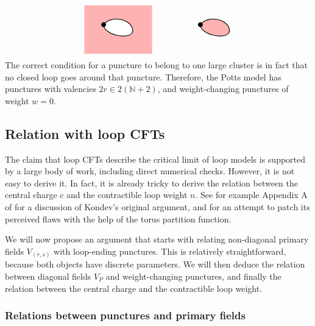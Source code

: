\documentclass[12pt, a4paper]{article}
\theoremstyle{break}
\begin{document}
\begin{align}
 \begin{tikzpicture}[baseline=(current  bounding  box.center), scale = .4]
  \fill[red!30] (-2, -3) rectangle (5, 2);
  \filldraw[thick, fill = white] (0, 0) to [out = -90, in = -80] (3, -.5) to [out = 100, in = 55] (0, 0);
   \draw (0, 0) node[fill, circle, minimum size = 2mm, inner sep = 0]{};
   \filldraw[thick, fill = red!30] (10, 0) to [out = -90, in = -80] (13, -.5) to [out = 100, in = 55] (10, 0);
   \draw (10, 0) node[fill, circle, minimum size = 2mm, inner sep = 0]{};
 \end{tikzpicture}
\end{align}
The correct condition for a puncture to belong to one large cluster is in fact that no closed loop goes around that puncture. 
Therefore, the Potts model has punctures with valencies $2r\in 2(\mathbb{N}+2)$, and weight-changing punctures of weight $w=0$.


\subsection{Relation with loop CFTs}

The claim that loop CFTs describe the critical limit of loop models is supported by a large body of work, including direct numerical checks. However, it is not easy to derive it. In fact, it is already tricky to derive the relation between the central charge $c$ and the contractible loop weight $n$. See for example Appendix A of \cite{grz18} for a discussion of Kondev's original argument, and for an attempt to patch its perceived flaws with the help of the torus partition function. 

We will now propose an argument that starts with relating non-diagonal primary fields $V_{(r,s)}$ with loop-ending punctures. This is relatively straightforward, because both objects have discrete parameters. We will then deduce the relation between diagonal fields $V_P$ and weight-changing punctures, and finally the relation between the central charge and the contractible loop weight. 

\subsubsection{Relations between punctures and primary fields}
\end{document}
